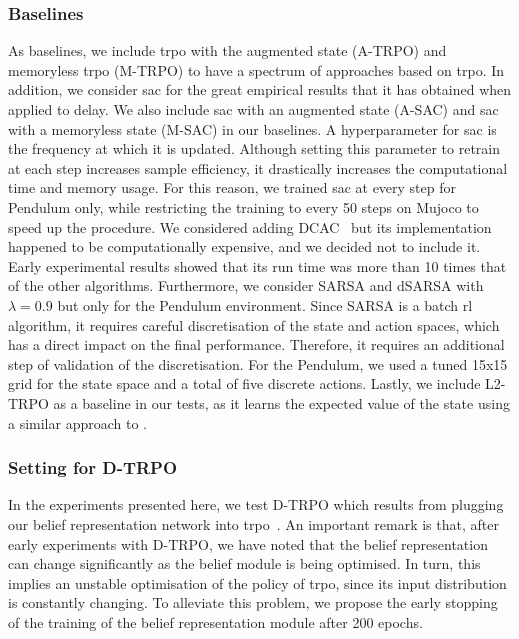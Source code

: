 \subsubsection{Baselines}
\label{subsubsec:baselines}
As baselines, we include \gls{trpo} with the augmented state (A-TRPO) and memoryless \gls{trpo} (M-TRPO) to have a spectrum of approaches based on \gls{trpo}. 
In addition, we consider \gls{sac} for the great empirical results that it has obtained when applied to delay\cite{ramstedt2019real,bouteiller2020reinforcement}. 
We also include \gls{sac} with an augmented state (A-SAC) and \gls{sac} with a memoryless state (M-SAC) in our baselines.
A hyperparameter for \gls{sac} is the frequency at which it is updated.
Although setting this parameter to retrain at each step increases sample efficiency, it drastically increases the computational time and memory usage. 
For this reason, we trained \gls{sac} at every step for Pendulum only, while restricting the training to every 50 steps on Mujoco to speed up the procedure.
We considered adding DCAC~\cite{bouteiller2020reinforcement} but its implementation happened to be computationally expensive, and we decided not to include it. 
Early experimental results showed that its run time was more than 10 times that of the other algorithms. 
Furthermore, we consider SARSA and dSARSA with $\lambda=0.9$ but only for the Pendulum environment. Since SARSA is a batch \gls{rl} algorithm, it requires careful discretisation of the state and action spaces, which has a direct impact on the final performance. 
Therefore, it requires an additional step of validation of the discretisation. 
For the Pendulum, we used a tuned 15x15 grid for the state space and a total of five discrete actions.
Lastly, we include L2-TRPO as a baseline in our tests, as it learns the expected value of the state using a similar approach to \cite{firoiu2018human}.


\subsubsection{Setting for D-TRPO}
In the experiments presented here, we test D-TRPO which results from plugging our belief representation network into \gls{trpo}~\cite{schulman2015trust}.
An important remark is that, after early experiments with D-TRPO, we have noted that the belief representation can change significantly as the belief module is being optimised.
In turn, this implies an unstable optimisation of the policy of \gls{trpo}, since its input distribution is constantly changing. 
To alleviate this problem, we propose the early stopping of the training of the belief representation module after 200 epochs. 


